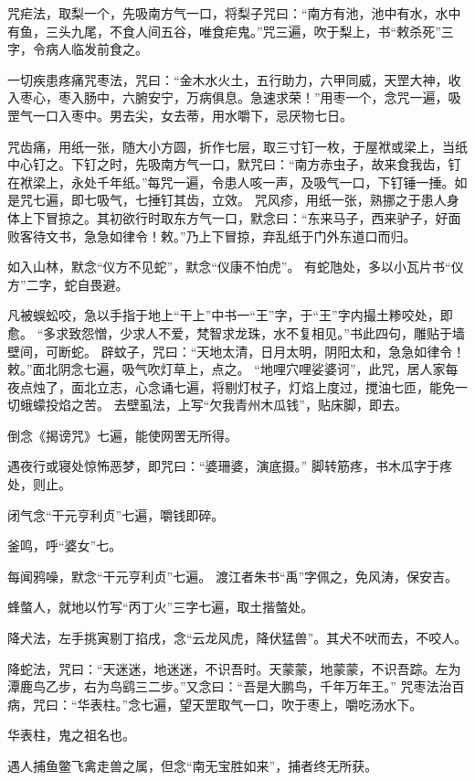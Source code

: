 \documentclass[a4paper,12pt,UTF8,twoside]{ctexbook}
\begin{document}
    咒疟法，取梨一个，先吸南方气一口，将梨子咒曰：“南方有池，池中有水，水中有鱼，三头九尾，不食人间五谷，唯食疟鬼。”咒三遍，吹于梨上，书“敕杀死”三字，令病人临发前食之。
    
    一切疾患疼痛咒枣法，咒曰：“金木水火土，五行助力，六甲同威，天罡大神，收入枣心，枣入肠中，六腑安宁，万病俱息。急速求荣！”用枣一个，念咒一遍，吸罡气一口入枣中。男去尖，女去蒂，用水嚼下，忌厌物七日。
    
    咒齿痛，用纸一张，随大小方圆，折作七层，取三寸钉一枚，于屋袱或梁上，当纸中心钉之。下钉之时，先吸南方气一口，默咒曰：“南方赤虫子，故来食我齿，钉在袱梁上，永处千年纸。”每咒一遍，令患人咳一声，及吸气一口，下钉锤一捶。如是咒七遍，即七吸气，七捶钉其齿，立效。 咒风疹，用纸一张，熟挪之于患人身体上下冒掠之。其初欲行时取东方气一口，默念曰：“东来马子，西来驴子，好面败客待文书，急急如律令！敕。”乃上下冒掠，弃乱纸于门外东道口而归。
    
    如入山林，默念“仪方不见蛇”，默念“仪康不怕虎”。 有蛇虺处，多以小瓦片书“仪方”二字，蛇自畏避。
    
    凡被蜈蚣咬，急以手指于地上“干上”中书一“王”字，于“王”字内撮土糁咬处，即愈。 “多求致怨憎，少求人不爱，梵智求龙珠，水不复相见。”书此四句，雕贴于墙壁间，可断蛇。 辟蚊子，咒曰：“天地太清，日月太明，阴阳太和，急急如律令！敕。”面北阴念七遍，吸气吹灯草上，点之。 “地哩穴哩娑婆诃”，此咒，居人家每夜点烛了，面北立志，心念诵七遍，将剔灯杖子，灯焰上度过，搅油七匝，能免一切蛾蠓投焰之苦。 去壁虱法，上写“欠我青州木瓜钱”，贴床脚，即去。
    
    倒念《揭谤咒》七遍，能使网罟无所得。
    
    遇夜行或寝处惊怖恶梦，即咒曰：“婆珊婆，演底摄。” 脚转筋疼，书木瓜字于疼处，则止。
    
    闭气念“干元亨利贞”七遍，嚼钱即碎。
    
    釜鸣，呼“婆女”七。
    
    每闻鸦噪，默念“干元亨利贞”七遍。 渡江者朱书“禹”字佩之，免风涛，保安吉。
    
    蜂螫人，就地以竹写“丙丁火”三字七遍，取土揩螫处。
    
    降犬法，左手挑寅剔丁掐戌，念“云龙风虎，降伏猛兽”。其犬不吠而去，不咬人。
    
    降蛇法，咒曰：“天迷迷，地迷迷，不识吾时。天蒙蒙，地蒙蒙，不识吾踪。左为潭鹿鸟乙步，右为鸟鹞三二步。”又念曰：“吾是大鹏鸟，千年万年王。” 咒枣法治百病，咒曰：“华表柱。”念七遍，望天罡取气一口，吹于枣上，嚼吃汤水下。
    
    华表柱，鬼之祖名也。
    
    遇人捕鱼鳖飞禽走兽之属，但念“南无宝胜如来”，捕者终无所获。
    
\end{document}
